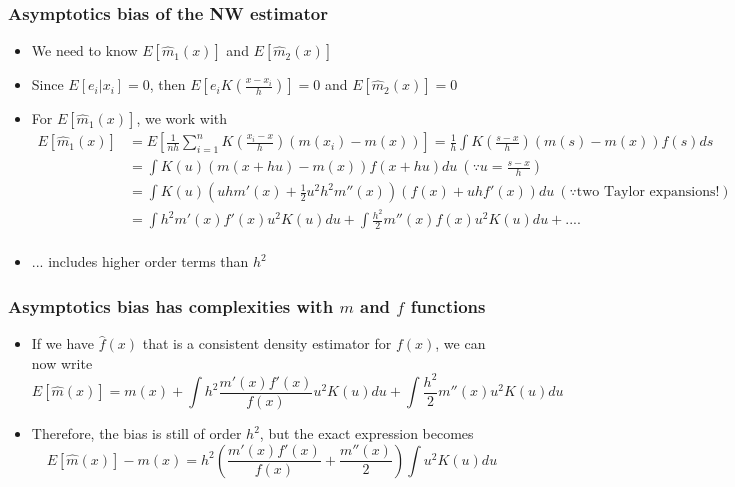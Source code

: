 \documentclass[aspectratio=169]{beamer}
\begin{document}
\begin{frame}
\frametitle{Asymptotics bias of the NW estimator}
 \begin{itemize}
 \item We need to know $E[\hat{m}_1(x)]$ and  $E[\hat{m}_2(x)]$
 \item Since $E[e_i|x_i]=0$, then $E\left[e_iK\left(\frac{x-x_i}{h}\right) \right]=0$ and $E[\hat{m}_2(x)]=0$
\item  For $E[\hat{m}_1(x)]$, we work with
\footnotesize{\[\begin{aligned}
E[\hat{m}_1(x)]&=E\left[ \frac{1}{nh}\sum_{i=1}^n K\left(\frac{x_i-x}{h}\right) (m(x_i)-m(x))\right] = \frac{1}{h}\int K\left(\frac{s-x}{h}\right) (m(s)-m(x))f(s)ds \\
&= \int K\left(u\right) (m(x+hu)-m(x))f(x+hu)du \ \left(\because u=\frac{s-x}{h}\right)\\
&= \int K\left(u\right) (uh m'(x)+ \frac{1}{2}u^2h^2 m''(x)) (f(x)+uhf'(x))du \ \left(\because \text{two Taylor expansions!}\right)\\
&=\int h^2m'(x)f'(x) u^2 K\left(u\right)du +\int \frac{h^2}{2} m''(x)f(x) u^2K(u)du + .... \\
\end{aligned}\]}\normalsize
\item ... includes higher order terms than $h^2$
 \end{itemize}
\end{frame}

\begin{frame}
\frametitle{Asymptotics bias has complexities with $m$ and $f$ functions}
 \begin{itemize}

\item  If we have $\hat{f}(x)$ that is a consistent density estimator for $f(x)$, we can now write
\[
E[\hat{m}(x)]=m(x) + \int h^2\frac{m'(x)f'(x)}{f(x)} u^2 K\left(u\right)du +\int \frac{h^2}{2} m''(x)u^2K(u)du
\]
\item Therefore, the bias is still of order $h^2$, but the exact expression becomes
\[
E[\hat{m}(x)]-m(x) = h^2 \left( \frac{m'(x)f'(x)}{f(x)} + \frac{m''(x)}{2} \right)\int u^2K(u)du
\]
 \end{itemize}
\end{frame}
\end{document}
